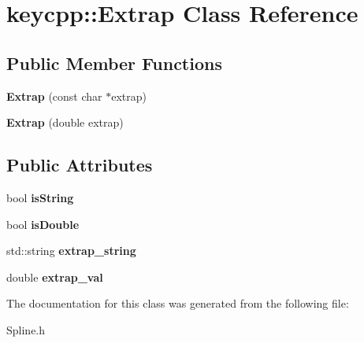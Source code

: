 \hypertarget{classkeycpp_1_1_extrap}{\section{keycpp\-:\-:Extrap Class Reference}
\label{classkeycpp_1_1_extrap}
}
\subsection*{Public Member Functions}
\begin{DoxyCompactItemize}
\item 
\hypertarget{classkeycpp_1_1_extrap_ae586bb0e00c6b14da76e78652f367874}{{\bfseries Extrap} (const char $\ast$extrap)}\label{classkeycpp_1_1_extrap_ae586bb0e00c6b14da76e78652f367874}

\item 
\hypertarget{classkeycpp_1_1_extrap_ab180e328298f67473e83998af95a2824}{{\bfseries Extrap} (double extrap)}\label{classkeycpp_1_1_extrap_ab180e328298f67473e83998af95a2824}

\end{DoxyCompactItemize}
\subsection*{Public Attributes}
\begin{DoxyCompactItemize}
\item 
\hypertarget{classkeycpp_1_1_extrap_a93fce8d80071b330c9d98a3c636bec59}{bool {\bfseries is\-String}}\label{classkeycpp_1_1_extrap_a93fce8d80071b330c9d98a3c636bec59}

\item 
\hypertarget{classkeycpp_1_1_extrap_a40e7a484deffd17a1b85bf4fc4c55df4}{bool {\bfseries is\-Double}}\label{classkeycpp_1_1_extrap_a40e7a484deffd17a1b85bf4fc4c55df4}

\item 
\hypertarget{classkeycpp_1_1_extrap_adbfea1e9b0f9e6adc8bf614eb68d7e4d}{std\-::string {\bfseries extrap\-\_\-string}}\label{classkeycpp_1_1_extrap_adbfea1e9b0f9e6adc8bf614eb68d7e4d}

\item 
\hypertarget{classkeycpp_1_1_extrap_a84fdd870171e056398ffe8d1360a9339}{double {\bfseries extrap\-\_\-val}}\label{classkeycpp_1_1_extrap_a84fdd870171e056398ffe8d1360a9339}

\end{DoxyCompactItemize}


The documentation for this class was generated from the following file\-:\begin{DoxyCompactItemize}
\item 
Spline.\-h\end{DoxyCompactItemize}
